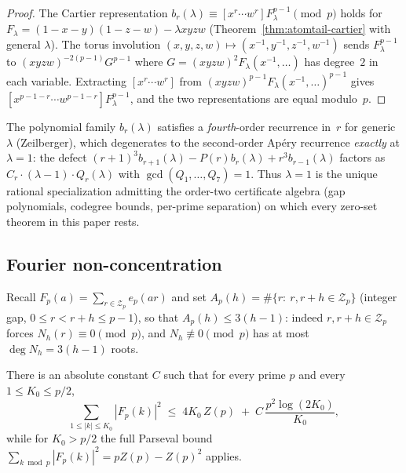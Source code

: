 \begin{proof}
The Cartier representation
$b_r(\lambda) \equiv [x^r \cdots w^r] F_\lambda^{p-1} \pmod{p}$
holds for $F_\lambda = (1{-}x{-}y)(1{-}z{-}w) - \lambda xyzw$
(Theorem~\ref{thm:atomtail-cartier} with general $\lambda$).
The torus involution $(x,y,z,w) \mapsto (x^{-1},y^{-1},z^{-1},w^{-1})$
sends $F_\lambda^{p-1}$ to $(xyzw)^{-2(p-1)} G^{p-1}$
where $G = (xyzw)^2 F_\lambda(x^{-1},\ldots)$
has degree~$2$ in each variable.
Extracting $[x^r \cdots w^r]$ from
$(xyzw)^{p-1} F_\lambda(x^{-1},\ldots)^{p-1}$ gives
$[x^{p-1-r} \cdots w^{p-1-r}] F_\lambda^{p-1}$,
and the two representations are equal modulo~$p$.
\end{proof}

\begin{remark}
\label{rem:atomtail-uniqueness}
The polynomial family $b_r(\lambda)$ satisfies a
\emph{fourth}-order recurrence in~$r$ for generic~$\lambda$
(Zeilberger), which degenerates to the second-order Ap\'ery
recurrence \emph{exactly} at $\lambda = 1$:
the defect $(r{+}1)^3 b_{r+1}(\lambda) - P(r) b_r(\lambda)
+ r^3 b_{r-1}(\lambda)$
factors as $C_r \cdot (\lambda - 1) \cdot Q_r(\lambda)$
with $\gcd(Q_1, \ldots, Q_7) = 1$.
Thus $\lambda = 1$ is the unique rational specialization
admitting the order-two certificate algebra
(gap polynomials, codegree bounds, per-prime separation)
on which every zero-set theorem in this paper rests.
\end{remark}

\subsection{Fourier non-concentration}

Recall $F_p(a)=\sum_{r\in\mathcal Z_p}e_p(ar)$ and set
$A_p(h)=\#\{r:\ r,r+h\in\mathcal Z_p\}$ (integer gap,
$0\le r<r+h\le p-1$), so that $A_p(h)\le3(h-1)$: indeed
$r,r+h\in\mathcal Z_p$ forces $N_h(r)\equiv0\pmod p$, and
$N_h\not\equiv0\pmod p$ has at most $\deg N_h=3(h-1)$ roots.

\begin{lemma}\label{lem:atomtail-energy}
There is an absolute constant $C$ such that for every prime $p$
and every $1\le K_0\le p/2$,
\[
 \sum_{1\le|k|\le K_0}|F_p(k)|^2
 \;\le\;4K_0\,Z(p)\;+\;C\,\frac{p^2\log(2K_0)}{K_0},
\]
while for $K_0>p/2$ the full Parseval bound
$\sum_{k\bmod p}|F_p(k)|^2=pZ(p)-Z(p)^2$ applies.
\end{lemma}

